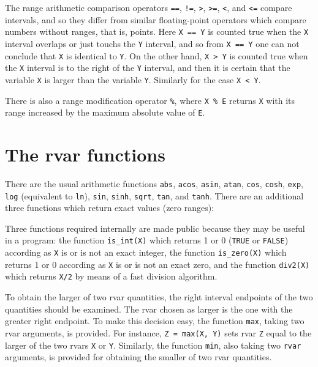The range arithmetic comparison operators  
{\tt ==}, {\tt !=}, {\tt >}, {\tt >=}, {\tt <}, and {\tt <=}
compare intervals, and so they differ from similar floating-point
operators which compare numbers without ranges, that is, points.
Here \hbox{\tt X == Y} is counted
true when the {\tt X} interval overlaps or just touchs the {\tt Y} interval,
and so from {\tt X == Y} one can not conclude that {\tt X} is identical
to {\tt Y}. On the other hand, {\tt X > Y} is counted true when
the {\tt X} interval is to the right of the {\tt Y} interval, and
then it is certain that the variable {\tt X} is larger than
the variable {\tt Y}. Similarly for the case {\tt X < Y}.

There is also a range modification operator {\tt \%},
where {\tt X \% E} returns {\tt X} with its range increased
by the maximum absolute value of {\tt E}. 

\section{The rvar functions}
There are the usual arithmetic functions
{\tt abs}, {\tt acos}, {\tt asin}, {\tt atan}, {\tt cos}, {\tt cosh},
{\tt exp}, {\tt log} (equivalent to {\tt ln}), {\tt sin}, {\tt sinh},
{\tt sqrt}, {\tt tan}, and {\tt tanh}. There are an additional three
functions which return exact values (zero ranges):\smallskip
{}

Three functions required internally are made public because
they may be useful in a program:  the function {\tt is\_int(X)}
which returns 1 or 0 ({\tt TRUE} or {\tt FALSE}) according as
{\tt X} is or is not
an exact integer, the function {\tt is\_zero(X)}
which returns 1 or 0 according as {\tt X} is or is not
an exact zero, and the function {\tt div2(X)} which returns {\tt X/2}
by means of a fast division algorithm.

To obtain the larger of two rvar quantities, the right interval endpoints
of the two quantities should be examined. The rvar chosen as larger is
the one with the greater right endpoint.
To make this decision easy, the function {\tt max}, taking two rvar
arguments, is provided.
For instance, \hbox{\tt Z = max(X, Y)} sets rvar {\tt Z} equal to the larger 
of the two rvars {\tt X} or {\tt Y}.
Similarly, the function {\tt min}, also taking two {\tt rvar} arguments,
is provided for obtaining the smaller of two rvar quantities.

